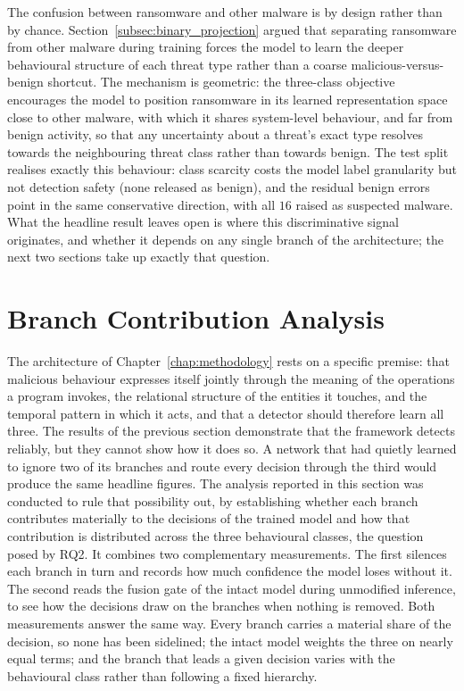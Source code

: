 \documentclass[%
    BCOR=10mm,
    DIV=13,
    toc=bibliography,
    toc=listof,
    oneside,
    12pt,
]{scrbook}
\begin{document}
The confusion between ransomware and other malware is by design rather than by
chance. Section~\ref{subsec:binary_projection} argued that
separating ransomware from other malware during training forces the model to
learn the deeper behavioural structure of each threat type rather than a
coarse malicious-versus-benign shortcut. The mechanism is geometric: the
three-class objective encourages the model to position ransomware in its learned
representation space close to other malware, with which it shares system-level
behaviour, and far from benign activity, so that any uncertainty about a
threat's exact type resolves towards the neighbouring threat class rather
than towards benign. The test split realises exactly this behaviour: class
scarcity costs the model label granularity but not detection safety (none
released as benign), and the residual benign errors point in the same
conservative direction, with all $16$ raised as suspected malware. What the
headline result leaves open is where
this discriminative signal originates, and whether it depends on any single
branch of the architecture; the next two sections take up exactly that
question.


\section{Branch Contribution Analysis}
\label{sec:component_attribution}

The architecture of Chapter~\ref{chap:methodology} rests on a specific premise:
that malicious behaviour expresses itself jointly through the meaning of the
operations a program invokes, the relational structure of the entities it
touches, and the temporal pattern in which it acts, and that a detector should
therefore learn all three. The results of the previous section demonstrate that
the framework detects reliably, but they cannot show how it does so. A network
that had quietly learned to ignore two of its branches and route every decision
through the third would produce the same headline figures. The analysis reported
in this section was conducted to rule that possibility out, by establishing
whether each branch contributes materially to the decisions of the trained
model and how that contribution is distributed across the three behavioural
classes, the question posed by RQ2. It combines two complementary measurements.
The first silences each branch in turn and records how much confidence the
model loses without it. The second reads the fusion gate of the intact model
during unmodified inference, to see how the decisions draw on the branches
when nothing is removed. Both measurements answer the same way. Every branch
carries a material share of the decision, so none has been sidelined; the
intact model weights the three on nearly equal terms; and the branch that
leads a given decision varies with the behavioural class rather than
following a fixed hierarchy.
\end{document}
